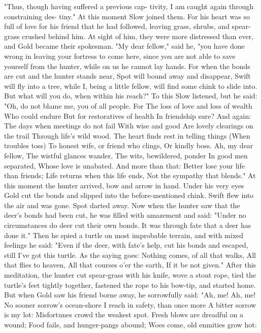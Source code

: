 \documentclass{book}
\begin{document}
"Thus, though having suffered a previous cap-
tivity, I am caught again through constraining des-
tiny."
At this moment Slow joined them. For his heart
was so full of love for his friend that he had followed,
leaving grass, shrubs, and spear-grass crushed behind
him. At sight of him, they were more distressed than
ever, and Gold became their spokesman. "My dear
fellow," said he, "you have done wrong in leaving
your fortress to come here, since you are not able to
save yourself from the hunter, while on us he cannot
lay hands. For when the bonds are cut and the hunter
stands near, Spot will bound away and disappear,
Swift will fly into a tree, while I, being a little fellow,
will find some chink to slide into. But what will you
do, when within his reach?"
To this Slow listened, but he said: "Oh, do not
blame me, you of all people. For
The loss of love and loss of wealth
Who could endure
But for restoratives of health
In friendship sure?
And again:
The days when meetings do not fail
With wise and good
Are lovely clearings on the trail
Through life's wild wood.
The heart finds rest in telling things
(When troubles toss)
To honest wife, or friend who clings,
Or kindly boss.
Ah, my dear fellow,
The wistful glances wander,
The wits, bewildered, ponder
In good men separated,
Whose love is unabated.
And more than that:
Better lose your life than friends;
Life returns when this life ends,
Not the sympathy that blends."
At this moment the hunter arrived, bow and arrow
in hand. Under his very eyes Gold cut the bonds and
slipped into the before-mentioned chink. Swift flew
into the air and was gone. Spot darted away.
Now when the hunter saw that the deer's bonds
had been cut, he was filled with amazement and
said: "Under no circumstances do deer cut their own
bonds. It was through fate that a deer has done it."
Then he spied a turtle on most improbable terrain,
and with mixed feelings he said: "Even if the deer,
with fate's help, cut his bonds and escaped, still I've
got this turtle. As the saying goes:
Nothing comes, of all that walks,
All that flies to heaven,
All that courses o'er the earth,
If it be not given."
After this meditation, the hunter cut spear-grass
with his knife, wove a stout rope, tied the turtle's feet
tightly together, fastened the rope to his bow-tip,
and started home. But when Gold saw his friend
borne away, he sorrowfully said: "Ah, me! Ah, me!
No sooner sorrow's ocean-shore
I reach in safety, than once more
A bitter sorrow is my lot:
Misfortunes crowd the weakest spot.
Fresh blows are dreadful on a wound;
Food fails, and hunger-pangs abound;
Woes come, old enmities grow hot:
\end{document}
